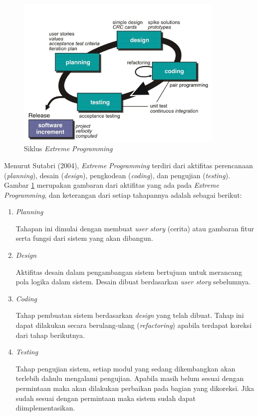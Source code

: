     \begin{figure}[H]
        \centering
        \includegraphics[width=10cm]{gambar/siklus-xp}
        \caption{Siklus \emph{Extreme Programming}}
        \label{siklus_xp}
    \end{figure}
  Menurut Sutabri (2004), \emph{Extreme Programming} terdiri dari aktifitas perencanaan (\emph{planning}), desain (\emph{design}), pengkodean (\emph{coding}), dan pengujian (\emph{testing}). Gambar \ref{siklus_xp} merupakan gambaran dari aktifitas yang ada pada \emph{Extreme Programming}, dan keterangan dari setiap tahapannya adalah sebagai berikut:
  \begin{enumerate}
      \itemsep0em
      \item \emph{Planning}
      
      Tahapan ini dimulai dengan membuat \emph{user story} (cerita) atau gambaran fitur serta fungsi dari sistem yang akan dibangun.
      \item \emph{Design}
      
      Aktifitas desain dalam pengambangan sistem bertujuan untuk merancang pola logika dalam sistem. Desain dibuat berdasarkan \emph{user story} sebelumnya.
      \item \emph{Coding}
      
      Tahap pembuatan sistem berdasarkan \emph{design} yang telah dibuat. Tahap ini dapat dilakukan secara berulang-ulang (\emph{refactoring}) apabila terdapat koreksi dari tahap berikutnya.
      \item \emph{Testing}
      
      Tahap pengujian sistem, setiap modul yang sedang dikembangkan akan terlebih dahulu mengalami pengujian. Apabila masih belum sesuai dengan permintaan maka akan dilakukan perbaikan pada bagian yang dikoreksi. Jika sudah sesuai dengan permintaan maka sistem sudah dapat diimplementasikan.
  \end{enumerate}
